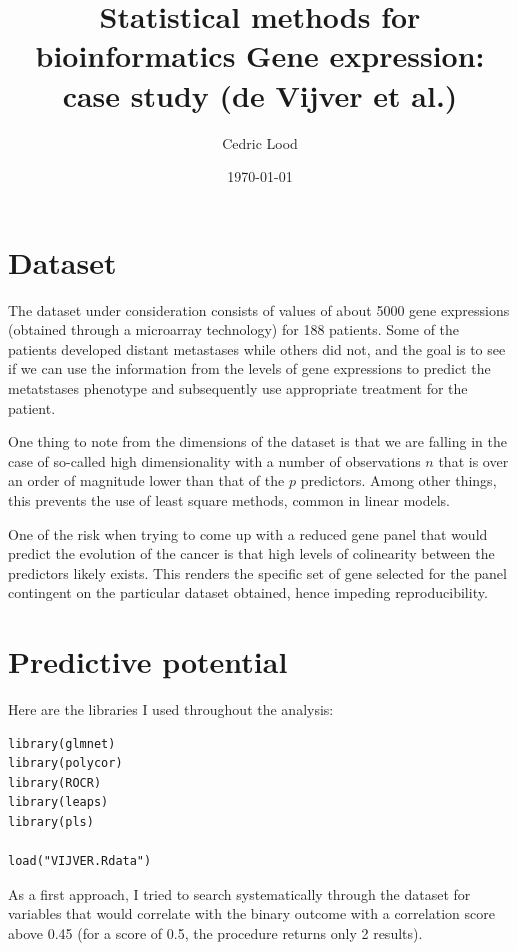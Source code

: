 \documentclass[11pt, a4paper]{article}
\title{Statistical methods for bioinformatics \linebreak Gene expression: case study (de Vijver et al.)}
\author{Cedric Lood}
\date{\today}
\begin{document}
\maketitle


\graphicspath{ {figures/} }
\setlength{\droptitle}{-5em} 
\setlength{\parindent}{0cm}

\section{Dataset}
\label{sec-1}

The dataset under consideration consists of values of about 5000 gene
expressions (obtained through a microarray technology) for 188
patients. Some of the patients developed distant metastases while
others did not, and the goal is to see if we can use the information
from the levels of gene expressions to predict the metatstases
phenotype and subsequently use appropriate treatment for the patient.

One thing to note from the dimensions of the dataset is that we are
falling in the case of so-called high dimensionality with a number of
observations $n$ that is over an order of magnitude lower than that of
the $p$ predictors. Among other things, this prevents the use of least
square methods, common in linear models. 

One of the risk when trying to come up with a reduced gene panel that
would predict the evolution of the cancer is that high levels of
colinearity between the predictors likely exists. This renders the
specific set of gene selected for the panel contingent on the
particular dataset obtained, hence impeding reproducibility.
\section{Predictive potential}
\label{sec-2}

Here are the libraries I used throughout the analysis:

\begin{verbatim}
library(glmnet)
library(polycor)
library(ROCR)
library(leaps)
library(pls)

load("VIJVER.Rdata")
\end{verbatim}

As a first approach, I tried to search systematically through the
dataset for variables that would correlate with the binary outcome
with a correlation score above 0.45 (for a score of 0.5, the procedure
returns only 2 results).
\end{document}
